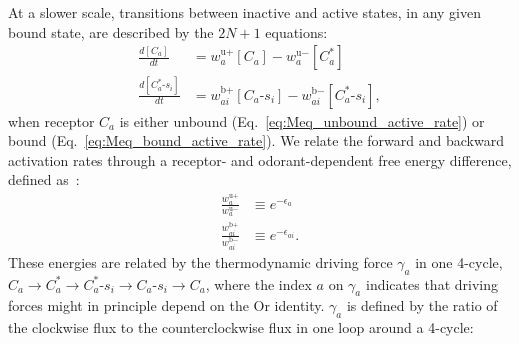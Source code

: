 \documentclass[9pt,twoside,lineno]{pnas-new}
\begin{document}
At a slower scale, transitions between inactive and active states, in any given bound state, are described by the $2N + 1$ equations:
\begin{align}
\frac{d[C_a]}{dt} &= w^{\text{u}+}_a [C_a] - w^{\text{u}-}_a [C^*_a] \label{eq:Meq_unbound_active_rate}\\
\frac{d[C^*_a\text{-}s_i]}{dt} &=  w^{\text{b}+}_{ai} [C_a\text{-}s_i] - w^{\text{b}-}_{ai}  [C^*_a\text{-}s_i],
\label{eq:Meq_bound_active_rate}
\end{align}
when receptor $C_a$ is either unbound (Eq.~\ref{eq:Meq_unbound_active_rate}) or bound (Eq.~\ref{eq:Meq_bound_active_rate}). We relate the forward and backward activation rates through a receptor- and odorant-dependent free energy difference, defined as~\cite{srinivas_elife}:
\begin{align}
\frac{w^{\text{u}+}_a}{w^{\text{u}-}_a} &\equiv e^{-\epsilon_a} \label{eq:epsilon_unbound} \\
\frac{w^{\text{b}+}_{ai}}{w^{\text{b}-}_{ai}} &\equiv e^{-\epsilon_{ai}}.\label{eq:epsilon_bound}
\end{align}
These energies are related by the thermodynamic driving force  $\gamma_a$ in one 4-cycle, $C_a \rightarrow C_a^* \rightarrow C_a^*\text{-}s_i \rightarrow C_a\text{-}s_i \rightarrow C_a$, 
where the index $a$ on $\gamma_a$ indicates that driving forces might in principle depend on the Or identity. $\gamma_a$ is defined by the ratio of the clockwise flux to the counterclockwise flux in one loop around a 4-cycle:
\end{document}
